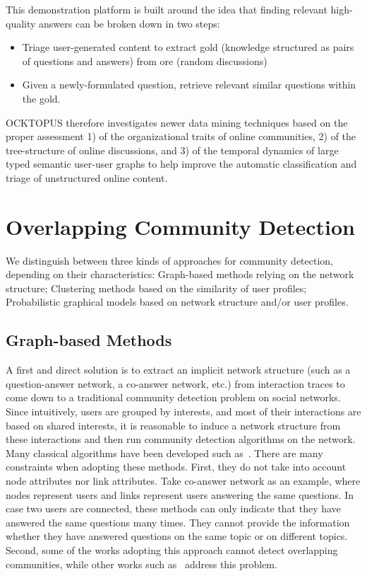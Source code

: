 This demonstration platform is built around the idea that finding relevant high-quality answers can be broken down in two steps:
\begin{itemize}
\item{Triage user-generated content to extract gold (knowledge structured as pairs of questions and answers) from ore (random discussions)}
\item{Given a newly-formulated question, retrieve relevant similar questions within the gold.}
\end{itemize}
OCKTOPUS therefore investigates newer data mining techniques based on the proper assessment 1) of the organizational traits of online communities, 2) of the tree-structure of online discussions, and 3) of the temporal dynamics of large typed semantic user-user graphs to help improve the automatic classification and triage of unstructured online content.



\section{Overlapping Community Detection}
We distinguish between three kinds of approaches for community detection, depending on their characteristics: Graph-based methods relying on the network structure; Clustering methods based on the similarity of user profiles; Probabilistic graphical models based on network structure and/or user profiles.

\subsection{Graph-based Methods}
A first and direct solution is to extract an implicit network structure (such as a question-answer network, a co-answer network, etc.) from interaction traces to come down to a traditional community detection problem on social networks. Since intuitively, users are grouped by interests, and most of their interactions are based on shared interests, it is reasonable to induce a network structure from these interactions and then run community detection algorithms on the network. Many classical algorithms have been developed such as~\cite{DBLP:journals/csur/XieKS13}\cite{ahn2010link}. There are many constraints when adopting these methods. First, they do not take into account node attributes nor link attributes. Take co-answer network as an example, where nodes represent users and links represent users answering the same questions. In case two users are connected, these methods can only indicate that they have answered the same questions many times. They cannot provide the information whether they have answered questions on the same topic or on different topics. Second, some of the works adopting this approach cannot detect overlapping communities, while other works such as~\cite{DBLP:journals/csur/XieKS13} address this problem.

